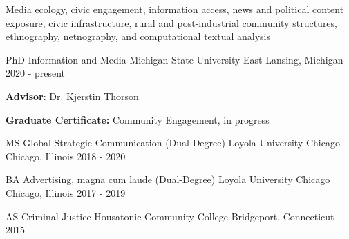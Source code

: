 

 \begin{small} \color{black} 
 Media ecology, civic engagement, information access, news and political content exposure, civic infrastructure, rural and post-industrial community structures, ethnography, netnography, and computational textual analysis
\end{small}




\begin{cventries}

  \cventry
    {PhD Information and Media} %
    {Michigan State University} %
    {East Lansing, Michigan} %
    {2020 - present} %
    {
      \begin{cvitems} %
              \item {\textbf{Advisor}: Dr. Kjerstin Thorson}
                \item {\textbf{Graduate Certificate:} Community Engagement, in progress}
      \end{cvitems}
    }

  \cventry
    {MS Global Strategic Communication (Dual-Degree)} %
    {Loyola University Chicago} %
    {Chicago, Illinois} %
    {2018 - 2020} %
    {
    }
    
\cventry
    {BA Advertising, magna cum laude (Dual-Degree)} %
    {Loyola University Chicago} %
    {Chicago, Illinois} %
    {2017 - 2019} %
    {
    }

  \cventry
    {AS Criminal Justice} %
    {Housatonic Community College} %
    {Bridgeport, Connecticut} %
    {2015} %
{
    }
\end{cventries}
